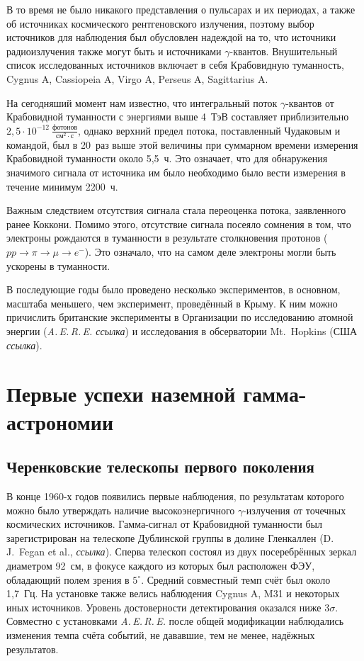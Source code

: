 \documentclass[magd,floatypics,numeref]{msudipl} %
\begin{document}
В то время не было никакого представления о пульсарах и их периодах, а также об источниках космического рентгеновского излучения, поэтому выбор источников для наблюдения был обусловлен надеждой на то, что источники радиоизлучения также могут быть и источниками $\gamma$-квантов. Внушительный список исследованных источников включает в себя Крабовидную туманность, Cygnus A, Cassiopeia A, Virgo A, Perseus A, Sagittarius A. 

На сегодняший момент нам известно, что интегральный поток $\gamma$-квантов от Крабовидной туманности с энергиями выше 4~ТэВ составляет приблизительно~$2,5\cdot10^{-12}~\frac{\text{фотонов}}{\text{см}^2\cdot\text{с}}$, однако верхний предел потока, поставленный Чудаковым и командой, был в 20~раз выше этой величины при суммарном времени измерения Крабовидной туманности около 5,5~ч. Это означает, что для обнаружения значимого сигнала от источника им было необходимо было вести измерения в течение минимум 2200~ч.

Важным следствием отсутствия сигнала стала переоценка потока, заявленного ранее Коккони. Помимо этого, отсутствие сигнала посеяло сомнения в том, что электроны рождаются в туманности в результате столкновения протонов ($pp \rightarrow\pi\rightarrow\mu\rightarrow e^-$). Это означало, что на самом деле электроны могли быть ускорены в туманности. 

В последующие годы было проведено несколько экспериментов, в основном, масштаба меньшего, чем эксперимент, проведённый в Крыму. К ним можно причислить британские эксперименты в Организации по исследованию атомной энергии (\textit{A.\,E.\,R.\,E.  ссылка}) и исследования в обсерватории Mt.~Hopkins (США \textit{ссылка}).

\section{Первые успехи наземной гамма-астрономии}
\subsection{Черенковские телескопы первого поколения}
В конце 1960-х годов появились первые наблюдения, по результатам которого можно было утверждать наличие высокоэнергичного $\gamma$-излучения от точечных космических источников. Гамма-сигнал от Крабовидной туманности был зарегистрирован на телескопе Дублинской группы в долине Гленкаллен (D.\,J.~Fegan et al., \textit{ссылка}). Сперва телескоп состоял из двух посеребрённых зеркал диаметром 92~см, в фокусе каждого из которых был расположен ФЭУ, обладающий полем зрения в $5^{\circ}$. Средний совместный темп счёт был около 1,7~Гц. На установке также велись наблюдения Cygnus A, M31 и некоторых иных источников. Уровень достоверности детектирования оказался ниже $3\sigma$. Совместно с установками \textit{A.\,E.\,R.\,E.} после общей модификации наблюдались изменения темпа счёта событий, не дававшие, тем не менее, надёжных результатов. 
\end{document}

